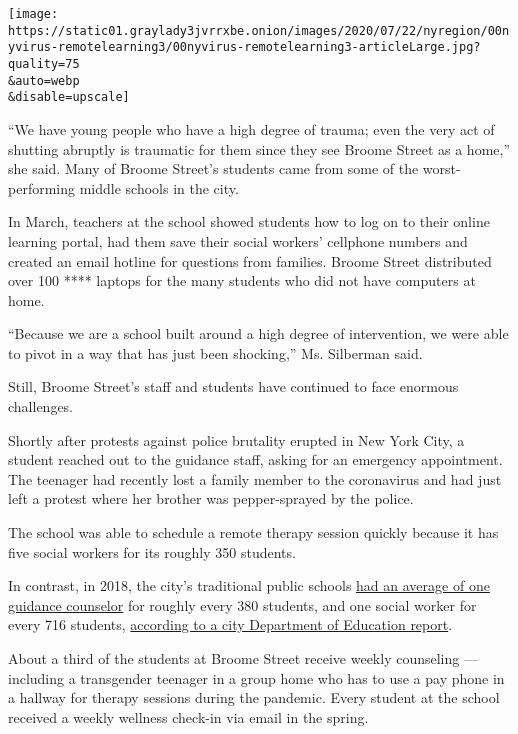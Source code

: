 \texttt{[image: https://static01.graylady3jvrrxbe.onion/images/2020/07/22/nyregion/00nyvirus-remotelearning3/00nyvirus-remotelearning3-articleLarge.jpg?quality=75\\\&auto=webp\\\&disable=upscale]}

``We have young people who have a high degree of trauma; even the very
act of shutting abruptly is traumatic for them since they see Broome
Street as a home,'' she said. Many of Broome Street's students came from
some of the worst-performing middle schools in the city.

In March, teachers at the school showed students how to log on to their
online learning portal, had them save their social workers' cellphone
numbers and created an email hotline for questions from families. Broome
Street distributed over 100 **** laptops for the many students who did
not have computers at home.

``Because we are a school built around a high degree of intervention, we
were able to pivot in a way that has just been shocking,'' Ms. Silberman
said.

Still, Broome Street's staff and students have continued to face
enormous challenges.

Shortly after protests against police brutality erupted in New York
City, a student reached out to the guidance staff, asking for an
emergency appointment. The teenager had recently lost a family member to
the coronavirus and had just left a protest where her brother was
pepper-sprayed by the police.

The school was able to schedule a remote therapy session quickly because
it has five social workers for its roughly 350 students.

In contrast, in 2018, the city's traditional public schools
\href{https://www.nydailynews.com/opinion/ny-oped-the-help-nyc-schoolkids-need-20200213-pii6zdvyebhhvoladadyacb2gi-story.html}{had
an average of one guidance counselor} for roughly every 380 students,
and one social worker for every 716 students,
\href{https://infohub.nyced.org/docs/default-source/default-document-library/guidance-counselor-report-and-summary-feb-2019.pdf}{according
to a city Department of Education report}.

About a third of the students at Broome Street receive weekly counseling
--- including a transgender teenager in a group home who has to use a
pay phone in a hallway for therapy sessions during the pandemic. Every
student at the school received a weekly wellness check-in via email in
the spring.

